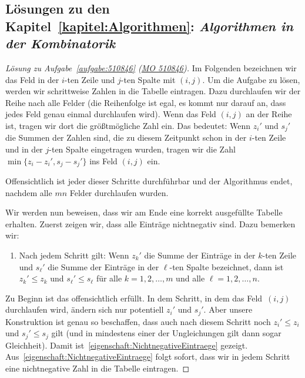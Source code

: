 \subsection*{Lösungen zu den Kapitel~\ref{kapitel:Algorithmen}: \emph{Algorithmen in der Kombinatorik}}

\begin{proof}[Lösung zu Aufgabe~\ref{aufgabe:510846} \textmd{(\href{https://www.mathematik-olympiaden.de/moev/index.php?option=com_download&thema=a&format=raw&datei=A51084b.pdf}{MO 510846})}]
	Im Folgenden bezeichnen wir das Feld in der $i$-ten Zeile und $j$-ten Spalte mit $(i,j)$. Um die Aufgabe zu lösen, werden wir schrittweise Zahlen in die Tabelle eintragen. Dazu durchlaufen wir der Reihe nach alle Felder (die Reihenfolge ist egal, es kommt nur darauf an, dass jedes Feld genau einmal durchlaufen wird). Wenn das Feld $(i,j)$ an der Reihe ist, tragen wir dort die größtmögliche Zahl ein. Das bedeutet: Wenn $z_i'$ und $s_j'$ die Summen der Zahlen sind, die zu diesem Zeitpunkt schon in der $i$-ten Zeile und in der $j$-ten Spalte eingetragen wurden, tragen wir die Zahl $\min\{z_i-z_i',s_j-s_j'\}$ ins Feld $(i,j)$ ein.
	
	Offensichtlich ist jeder dieser Schritte durchführbar und der Algorithmus endet, nachdem alle $mn$ Felder durchlaufen wurden.
	
	Wir werden nun beweisen, dass wir am Ende eine korrekt ausgefüllte Tabelle erhalten. Zuerst zeigen wir, dass alle Einträge nichtnegativ sind. Dazu bemerken wir:
	\begin{enumerate}[label={$(\arabic*)$},ref={$(\arabic*)$}]\itshape
		\item Nach jedem Schritt gilt: Wenn $z_k'$ die Summe der Einträge in der $k$-ten Zeile und $s_\ell'$ die Summe der Einträge in der $\ell$-ten Spalte bezeichnet, dann ist $z_k'\leqslant z_k$ und $s_\ell'\leqslant s_\ell$ für alle  $k=1,2,\dotsc,m$ und alle $\ell=1,2,\dotsc,n$.\label{eigenschaft:NichtnegativeEintraege}
	\end{enumerate}
	Zu Beginn ist das offensichtlich erfüllt. In dem Schritt, in dem das Feld~$(i,j)$ durchlaufen wird, ändern sich nur potentiell $z_i'$ und $s_j'$. Aber unsere Konstruktion ist genau so beschaffen, dass auch nach diesem Schritt noch $z_i'\leqslant z_i$ und $s_j'\leqslant s_j$ gilt (und in mindestens einer der Ungleichungen gilt dann sogar Gleichheit). Damit ist~\ref{eigenschaft:NichtnegativeEintraege} gezeigt. Aus~\ref{eigenschaft:NichtnegativeEintraege} folgt sofort, dass wir in jedem Schritt eine nichtnegative Zahl in die Tabelle eintragen.
	

\end{proof}

